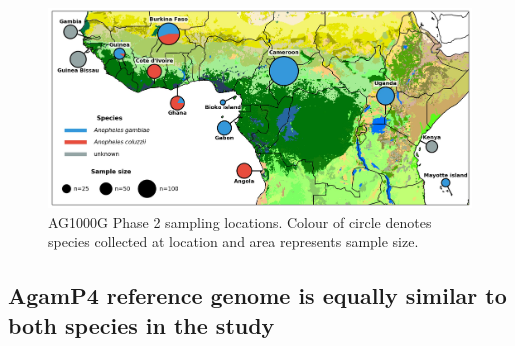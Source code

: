 \documentclass[a4paper,11pt,abstracton,hidelinks]{scrartcl}
\begin{document}
\begin{figure}[h]
	\begin{center}
		\includegraphics*[width=6.3in]{artwork/collection_site_map.jpg}
	\end{center}
	\caption{AG1000G Phase 2 sampling locations. Colour of circle denotes species collected at location and area represents sample size.}
	\label{sample_map}
\end{figure}


%


\subsection*{AgamP4 reference genome is equally similar to both species in the study}
\end{document}
